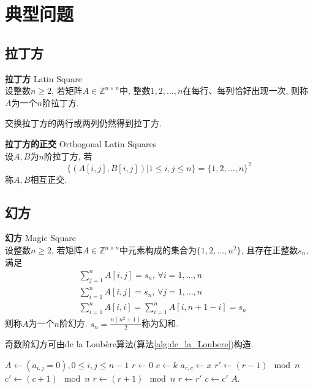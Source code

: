 \section{典型问题}

\subsection{拉丁方}

\begin{dfn}\textbf{拉丁方} Latin Square\\
设整数$n\ge 2$, 若矩阵$A\in \mathbb{Z}^{n\times n}$中, 整数$1,2,\dots,n$在每行、每列恰好出现一次, 则称$A$为一个$n$阶拉丁方. 
\end{dfn}
\par 交换拉丁方的两行或两列仍然得到拉丁方. 

\begin{dfn}\textbf{拉丁方的正交} Orthogonal Latin Squares\\
设$A,B$为$n$阶拉丁方, 若
\begin{equation}
    \{(A[i,j],B[i,j])\vert 1\le i,j\le n\}=\{1,2,\dots,n\}^2
\end{equation}
称$A,B$相互正交. 
\end{dfn}

\subsection{幻方}

\begin{dfn}\textbf{幻方} Magic Square\\
设整数$n\ge 2$, 若矩阵$A\in \mathbb{Z}^{n\times n}$中元素构成的集合为$\{1,2,\dots,n^2\}$, 且存在正整数$s_n$, 满足
\begin{align}
    &\sum_{j=1}^n A[i,j] = s_n, \, \forall i=1,\dots,n\\
    &\sum_{i=1}^n A[i,j] = s_n, \, \forall j=1,\dots,n\\
    &\sum_{i=1}^n A[i,i] = \sum_{i=1}^n A[i,n+1-i]= s_n
\end{align}
则称$A$为一个$n$阶幻方. $s_n=\frac{n(n^2+1)}{2}$称为幻和. 
\end{dfn}

\par 奇数阶幻方可由de la Loubère算法(算法\ref{alg:de_la_Loubere})构造.  

\begin{algorithm}[ht!]
\caption{生成奇数阶幻方的de la Loubère算法} 
\label{alg:de_la_Loubere}
$A\leftarrow (a_{i,j}=0), 0\le i,j \le n-1$\;
$r\leftarrow 0$\;
$c\leftarrow k$\;
{
    $a_{r,c}\leftarrow x$\;
    $r'\leftarrow (r-1)\mod n$\;
    $c'\leftarrow (c+1)\mod n$\;
    {$r\leftarrow (r+1)\mod n$\;}
    {$r\leftarrow r'$\;
    $c\leftarrow c'$\;}
}
\Return $A$.
\end{algorithm}


